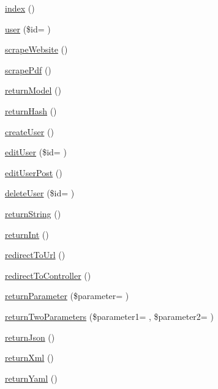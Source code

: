 \begin{DoxyCompactItemize}
\item 
\hyperlink{class_basic_a149eb92716c1084a935e04a8d95f7347}{index} ()
\item 
\hyperlink{class_basic_aaa1766e82db149150ed98413794c1da7}{user} (\$id= \textquotesingle{}\textquotesingle{})
\item 
\hyperlink{class_basic_a48ffe9a27b91ce968b2bcf5e0a9d4069}{scrape\+Website} ()
\item 
\hyperlink{class_basic_a67dbb38567401c856d5361d6704874d5}{scrape\+Pdf} ()
\item 
\hyperlink{class_basic_a7cb6a02987f0faaef2ee4aff9198907e}{return\+Model} ()
\item 
\hyperlink{class_basic_a16df2136bd66a75022f350d583e6c060}{return\+Hash} ()
\item 
\hyperlink{class_basic_a967982ee98f05287bbdba812f6016947}{create\+User} ()
\item 
\hyperlink{class_basic_af33bb7dc63239122119705ef092147e7}{edit\+User} (\$id= \textquotesingle{}\textquotesingle{})
\item 
\hyperlink{class_basic_a445a1f2f42c756bf451de087e36b7193}{edit\+User\+Post} ()
\item 
\hyperlink{class_basic_a1ad1cd8575df67e148023f5e9f9f6a94}{delete\+User} (\$id= \textquotesingle{}\textquotesingle{})
\item 
\hyperlink{class_basic_a5bb666dcea19a9561c2047cfa25936bd}{return\+String} ()
\item 
\hyperlink{class_basic_a8d2918087022004ef5ad62d8f76a73d7}{return\+Int} ()
\item 
\hyperlink{class_basic_abf786273f796a96f5532dc60f9cec813}{redirect\+To\+Url} ()
\item 
\hyperlink{class_basic_a53f01fc4c43d1cecc497d9645f920407}{redirect\+To\+Controller} ()
\item 
\hyperlink{class_basic_ab5cca41d57b6457b974025ce9e2160a0}{return\+Parameter} (\$parameter= \textquotesingle{}\textquotesingle{})
\item 
\hyperlink{class_basic_a3127aa274a2b885e0b94ea8bc8697adb}{return\+Two\+Parameters} (\$parameter1= \textquotesingle{}\textquotesingle{}, \$parameter2= \textquotesingle{}\textquotesingle{})
\item 
\hyperlink{class_basic_aab9c1fc26dd9ab7939d5eb9e77c2c4a5}{return\+Json} ()
\item 
\hyperlink{class_basic_ab7183791265fc4aa7b57f81ed4cbf791}{return\+Xml} ()
\item 
\hyperlink{class_basic_a1728e20001f09f21fbf27251f3eeff52}{return\+Yaml} ()
\end{DoxyCompactItemize}
